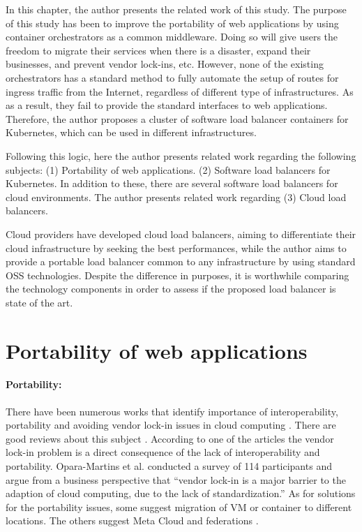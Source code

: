In this chapter, the author presents the related work of this study.
The purpose of this study has been to improve the portability of web applications by using container orchestrators as a common middleware.
Doing so will give users the freedom to migrate their services when there is a disaster, expand their businesses, and prevent vendor lock-ins, etc.
However, none of the existing orchestrators has a standard method to fully automate the setup of routes for ingress traffic from the Internet, regardless of different type of infrastructures.
As as a result, they fail to provide the standard interfaces to web applications.
Therefore, the author proposes a cluster of software load balancer containers for Kubernetes, which can be used in different infrastructures.

Following this logic, here the author presents related work regarding the following subjects:
(1) Portability of web applications.
(2) Software load balancers for Kubernetes.
In addition to these, there are several software load balancers for cloud environments.
The author presents related work regarding (3) Cloud load balancers.

Cloud providers have developed cloud load balancers, aiming to differentiate their cloud infrastructure by seeking the best performances, while the author aims to provide a portable load balancer common to any infrastructure by using standard OSS technologies.
%
Despite the difference in purposes, it is worthwhile comparing the technology components in order to assess if the proposed load balancer is state of the art.


\section{Portability of web applications}

\paragraph{\bf Portability:}

There have been numerous works that identify importance of interoperability, portability and avoiding vendor lock-in issues in cloud computing \cite{kratzke2016clouns,opara2014critical,opara2016critical,mansour2016interoperability,kaur2017interoperability,kaur2017interoperability,di2015cloud}.
There are good reviews about this subject \cite{kaur2017interoperability,petcu2014portability}.
According to one of the articles the vendor lock-in problem is a direct consequence of the lack of interoperability and portability.
%
Opara-Martins et al. \cite{opara2016critical} conducted a survey of 114 participants and argue from a business perspective that \enquote{vendor lock-in is a major barrier to the adaption of cloud computing, due to the lack of standardization.}
%
As for solutions for the portability issues,
some suggest migration of VM or container \cite{nagin2011inter,messina2014trust} to different locations.
The others suggest Meta Cloud \cite{satzger2013winds} and federations \cite{K8sFederation2017}.

